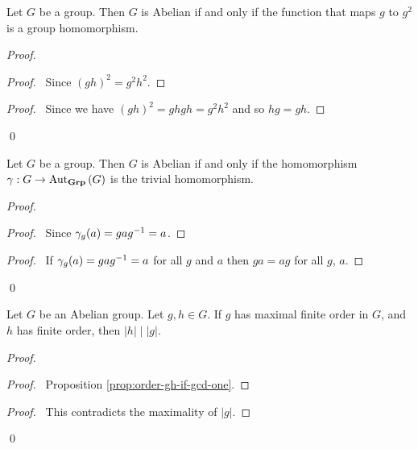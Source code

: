 \begin{prop}
    Let $G$ be a group. Then $G$ is Abelian if and only if the function that maps $g$ to $g^2$ is a group homomorphism.
\end{prop}

\begin{proof}
    \pf
    \begin{proof}
        \pf\ Since $(gh)^2 = g^2h^2$.
    \end{proof}
    \begin{proof}
        \pf\ Since we have $(gh)^2 = ghgh = g^2 h^2$ and so $hg = gh$.
    \end{proof}
    \qed
\end{proof}

\begin{prop}
    Let $G$ be a group. Then $G$ is Abelian if and only if the homomorphism $\gamma : G \rightarrow \mathrm{Aut}_{\mathbf{Grp}} \left( {G} \right)$ is the trivial homomorphism.
\end{prop}

\begin{proof}
    \pf
    \begin{proof}
        \pf\ Since $\gamma_g(a) = ga{g}^{-1} = a$.
    \end{proof}
    \begin{proof}
        \pf\ If $\gamma_g(a) = ga{g}^{-1} = a$ for all $g$ and $a$ then $ga = ag$ for all $g$, $a$.
    \end{proof}
    \qed
\end{proof}

\begin{prop}
    \label{prop:maximal-finite-order}
    Let $G$ be an Abelian group. Let $g,h \in G$. If $g$ has maximal finite order in $G$, and $h$ has finite order, then $|h| \mid |g|$.
\end{prop}

\begin{proof}
    \pf
    \begin{proof}
        \pf\ Proposition \ref{prop:order-gh-if-gcd-one}.
    \end{proof}
    \qedstep
    \begin{proof}
        \pf\ This contradicts the maximality of $|g|$.
    \end{proof}
    \qed
\end{proof}

